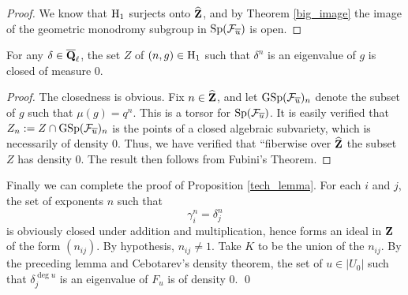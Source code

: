\begin{proof}
We know that $\mathrm{H}_1$ surjects onto $\widehat{\mathbf{Z}}$, and by Theorem \ref{big_image} the image of the geometric monodromy subgroup in $\operatorname{Sp}(\mathcal{F}_{\overline{u}})$ is open. 
\end{proof}

\begin{lem}
For any $\delta \in \overline{\mathbf{Q}}_{\ell}$, the set $Z$ of $(n,g) \in \mathrm{H}_1$ such that $\delta^n$ is an eigenvalue of $g$ is closed of measure $0$. 
\end{lem}

\begin{proof}
The closedness is obvious. Fix $n \in \widehat{\mathbf{Z}}$, and let $\mathrm{GSp}(\mathcal{F}_{\overline{u}})_n$ denote the subset of $g$ such that $\mu(g) = q^n$. This is a torsor for $\mathrm{Sp}(\mathcal{F}_{\overline{u}})$. It is easily verified that $Z_n := Z \cap \mathrm{GSp}(\mathcal{F}_{\overline{u}})_n$ is the points of a closed algebraic subvariety, which is necessarily of density $0$. Thus, we have verified that ``fiberwise over $\widehat{\mathbf{Z}}$ the subset $Z$ has density $0$. The result then follows from Fubini's Theorem. 
\end{proof}


Finally we can complete the proof of Proposition \ref{tech_lemma}. For each $i$ and $j$, the set of exponents $n$ such that 
\[
\gamma_i^n = \delta_j^n
\]
is obviously closed under addition and multiplication, hence forms an ideal in $\mathbf{Z}$ of the form $(n_{ij})$. By hypothesis, $n_{ij} \neq 1$. Take $K$ to be the union of the $n_{ij}$. By the preceding lemma and Cebotarev's density theorem, the set of $u\in |U_0|$ such that $\delta_j^{\deg u}$ is an eigenvalue of $F_u$ is of density $0$. \qed






%
%

%


